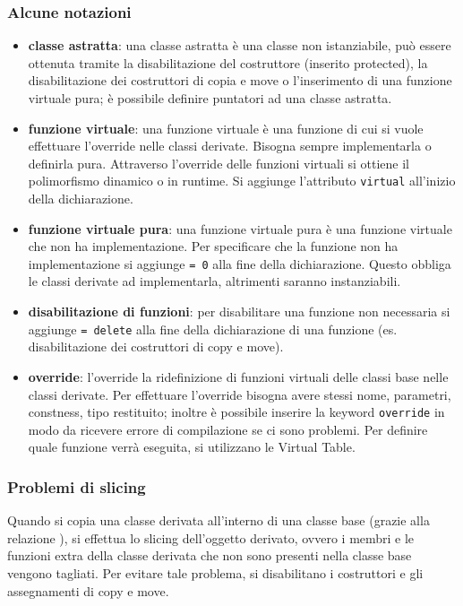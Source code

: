 \documentclass[a4paper]{article}
\begin{document}
\subsubsection*{Alcune notazioni}
\begin{itemize}
	\item \textbf{classe astratta}: una classe astratta è una classe non istanziabile, può essere ottenuta tramite la
	disabilitazione del costruttore (inserito protected), la disabilitazione dei costruttori di copia e move o l'inserimento di
	una funzione virtuale pura; è possibile definire puntatori ad una classe astratta.
	\item \textbf{funzione virtuale}: una funzione virtuale è una funzione di cui si vuole effettuare l'override nelle classi
	derivate. Bisogna sempre implementarla o definirla pura. Attraverso l'override delle funzioni virtuali si ottiene il
	polimorfismo dinamico o in runtime. Si aggiunge l'attributo \verb|virtual| all'inizio della dichiarazione.
	\item \textbf{funzione virtuale pura}: una funzione virtuale pura è una funzione virtuale che non ha implementazione. Per
	specificare che la funzione non ha implementazione si aggiunge \verb|= 0| alla fine della dichiarazione. Questo obbliga le
	classi derivate ad implementarla, altrimenti saranno instanziabili.
	\item \textbf{disabilitazione di funzioni}: per disabilitare una funzione non necessaria si aggiunge \verb|= delete| alla fine
	della dichiarazione di una funzione (es. disabilitazione dei costruttori di copy e move).
	\item \textbf{override}: l'override la ridefinizione di funzioni virtuali delle classi base nelle classi derivate. Per
	effettuare l'override bisogna avere stessi nome, parametri, constness, tipo restituito; inoltre è possibile inserire la keyword
	\verb|override| in modo da ricevere errore di compilazione se ci sono problemi. Per definire quale funzione verrà eseguita, si
	utilizzano le Virtual Table.
\end{itemize}

\subsubsection*{Problemi di slicing}
Quando si copia una classe derivata all'interno di una classe base (grazie alla relazione ), si effettua lo slicing
dell'oggetto derivato, ovvero i membri e le funzioni extra della classe derivata che non sono presenti nella classe base vengono
tagliati. Per evitare tale problema, si disabilitano i costruttori e gli assegnamenti di copy e move.
\end{document}
